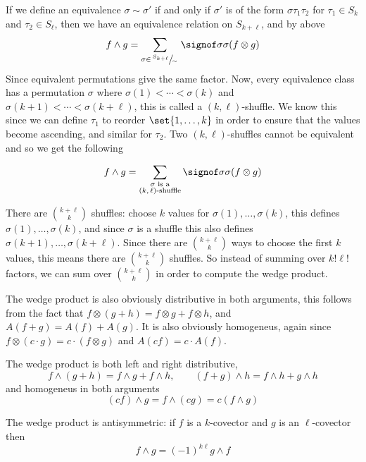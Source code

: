 \documentclass[10pt]{article}
\begin{document}
If we define an equivalence $\sigma\sim\sigma'$ if and only if $\sigma'$ is of the form $\sigma\tau_1\tau_2$ for $\tau_1\in S_k$ and $\tau_2\in S_\ell$, then we have an equivalence relation on $S_{k+\ell}$, 
and by above
\[ f\wedge g = \sum_{\sigma\in\slfrac{S_{k+\ell}}\sim} \signof\sigma\sigma(f\otimes g) \]
Since equivalent permutations give the same factor.
Now, every equivalence class has a permutation $\sigma$ where $\sigma(1)<\cdots<\sigma(k)$ and $\sigma(k+1)<\cdots<\sigma(k+\ell)$, this is called a $(k,\ell)$-shuffle.
We know this since we can define $\tau_1$ to reorder $\set{1,\dots,k}$ in order to ensure that the values become ascending, and similar for $\tau_2$.
Two $(k,\ell)$-shuffles cannot be equivalent and so we get the following

\begin{prop*}

    \[ f\wedge g = \sum_{\substack{\sigma\text{ is a}\\\text{$(k,\ell)$-shuffle}}}\signof\sigma\sigma(f\otimes g) \]

\end{prop*}

There are $\binom{k+\ell}k$ shuffles: choose $k$ values for $\sigma(1),\dots,\sigma(k)$, this defines $\sigma(1),\dots,\sigma(k)$, and since $\sigma$ is a shuffle this also defines
$\sigma(k+1),\dots,\sigma(k+\ell)$.
Since there are $\binom{k+\ell}k$ ways to choose the first $k$ values, this means there are $\binom{k+\ell}k$ shuffles.
So instead of summing over $k!\ell!$ factors, we can sum over $\binom{k+\ell}k$ in order to compute the wedge product.

The wedge product is also obviously distributive in both arguments, this follows from the fact that $f\otimes(g+h)=f\otimes g+f\otimes h$, and $A(f+g)=A(f)+A(g)$.
It is also obviously homogeneus, again since $f\otimes(c\cdot g)=c\cdot(f\otimes g)$ and $A(cf)=c\cdot A(f)$.

\begin{prop*}

    The wedge product is both left and right distributive,
    \[ f\wedge(g+h) = f\wedge g+f\wedge h,\qquad (f+g)\wedge h = f\wedge h+g\wedge h \]
    and homogeneus in both arguments
    \[ (cf)\wedge g = f\wedge(cg) = c(f\wedge g) \]

\end{prop*}

\begin{prop*}

    The wedge product is antisymmetric: if $f$ is a $k$-covector and $g$ is an $\ell$-covector then
    \[ f\wedge g = (-1)^{k\ell}g\wedge f \]

\end{prop*}
\end{document}
